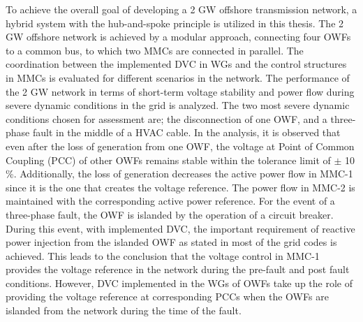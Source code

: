 To achieve the overall goal of developing a 2 GW offshore transmission network, a hybrid system with the hub-and-spoke principle is utilized in this thesis. The 2 GW offshore network is achieved by a modular approach, connecting four OWFs to a common bus, to which two MMCs are connected in parallel. The coordination between the implemented DVC in WGs and the control structures in MMCs is evaluated for different scenarios in the network. The performance of the 2 GW network in terms of short-term voltage stability and power flow during severe dynamic conditions in the grid is analyzed. The two most severe dynamic conditions chosen for assessment are; the disconnection of one OWF, and a three-phase fault in the middle of a HVAC cable. In the analysis, it is observed that even after the loss of generation from one OWF, the voltage at Point of Common Coupling (PCC) of other OWFs remains stable within the tolerance limit of $\pm$ 10 \%. Additionally, the loss of generation decreases the active power flow in MMC-1 since it is the one that creates the voltage reference. The power flow in MMC-2 is maintained with the corresponding active power reference. For the event of a three-phase fault, the OWF is islanded by the operation of a circuit breaker. During this event, with implemented DVC, the important requirement of reactive power injection from the islanded OWF as stated in most of the grid codes is achieved. This leads to the conclusion that the voltage control in MMC-1 provides the voltage reference in the network during the pre-fault and post fault conditions. However, DVC implemented in the WGs of OWFs take up the role of providing the voltage reference at corresponding PCCs when the OWFs are islanded from the network during the time of the fault. 
